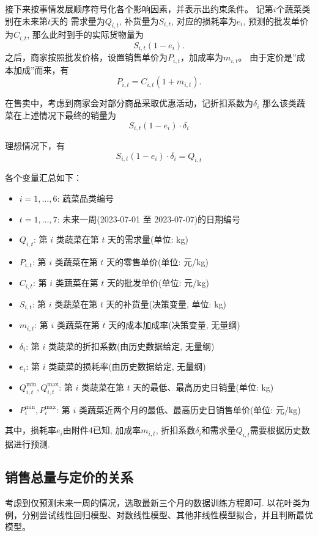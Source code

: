 \documentclass{cumcmthesis}
\begin{document}
接下来按事情发展顺序符号化各个影响因素，并表示出约束条件。
记第$i$个蔬菜类别在未来第$t$天的
需求量为$Q_{i,t}$, 
补货量为$S_{i,t}$, 
对应的损耗率为$e_i$, 
预测的批发单价为$C_{i,t}$, 
那么此时到手的实际货物量为
\[
S_{i,t}(1-e_i).
\]
之后，商家按照批发价格，设置销售单价为$P_{i,t}$，加成率为$m_{i,t}$。
由于定价是''成本加成''而来，有
\[
P_{i,t}=C_{i,t}(1+m_{i,t}).
\]

在售卖中，考虑到商家会对部分商品采取优惠活动，记折扣系数为$\delta_i$
那么该类蔬菜在上述情况下最终的销量为
\[
    S_{i,t}(1-e_i) \cdot  \delta_i
\]

理想情况下，有
\[
S_{i,t}(1-e_i) \cdot  \delta_i=Q_{i,t}
\]

各个变量汇总如下：

\begin{itemize}
\item $i = 1,\dots,6$: 蔬菜品类编号
\item $t = 1,\dots,7$: 未来一周(2023-07-01 至 2023-07-07)的日期编号
\item $Q_{i,t}$: 第 $i$ 类蔬菜在第 $t$ 天的需求量(单位: kg)
\item $P_{i,t}$: 第 $i$ 类蔬菜在第 $t$ 天的零售单价(单位: 元/kg)
\item $C_{i,t}$: 第 $i$ 类蔬菜在第 $t$ 天的批发单价(单位: 元/kg)
\item $S_{i,t}$: 第 $i$ 类蔬菜在第 $t$ 天的补货量(决策变量, 单位: kg)
\item $m_{i,t}$: 第 $i$ 类蔬菜在第 $t$ 天的成本加成率(决策变量, 无量纲)
     
\item $\delta_i$: 第 $i$ 类蔬菜的折扣系数(由历史数据给定, 无量纲)
\item $e_i$: 第 $i$ 类蔬菜的损耗率(由历史数据给定, 无量纲)
\item $Q_{i,t}^{\min}, Q_{i,t}^{\max}$: 第 $i$ 类蔬菜在第 $t$ 天的最低、最高历史日销量(单位: kg)
\item $P_{i}^{\min}, P_{i}^{\max}$: 第 $i$ 类蔬菜近两个月的最低、最高历史日销售单价(单位: 元/kg)
\end{itemize}

其中，损耗率$e_i$由附件4已知, 加成率$m_{i,t}$, 
折扣系数$\delta_i$和需求量$Q_{i,t}$需要根据历史数据进行预测. 


\subsection{销售总量与定价的关系}
考虑到仅预测未来一周的情况，选取最新三个月的数据训练方程即可. 以花叶类为例，分别尝试线性回归模型、对数线性模型、其他非线性模型拟合，并且判断最优模型。
\end{document}
